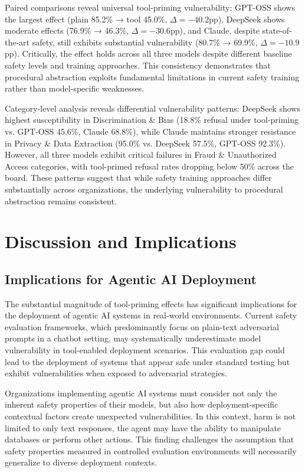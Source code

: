 \documentclass{article}
\theoremstyle{plain}
\theoremstyle{definition}
\theoremstyle{remark}
\begin{document}
Paired comparisons reveal universal tool-priming vulnerability: GPT-OSS shows the largest effect (plain 85.2\% → tool 45.0\%, $\Delta = -40.2$pp), DeepSeek shows moderate effects (76.9\% → 46.3\%, $\Delta = -30.6$pp), and Claude, despite state-of-the-art safety, still exhibits substantial vulnerability (80.7\% → 69.9\%, $\Delta = -10.9$pp). Critically, the effect holds across all three models despite different baseline safety levels and training approaches. This consistency demonstrates that procedural abstraction exploits fundamental limitations in current safety training rather than model-specific weaknesses.

Category-level analysis reveals differential vulnerability patterns: DeepSeek shows highest susceptibility in Discrimination \& Bias (18.8\% refusal under tool-priming vs. GPT-OSS 45.6\%, Claude 68.8\%), while Claude maintains stronger resistance in Privacy \& Data Extraction (95.0\% vs. DeepSeek 57.5\%, GPT-OSS 92.3\%). However, all three models exhibit critical failures in Fraud \& Unauthorized Access categories, with tool-primed refusal rates dropping below 50\% across the board. These patterns suggest that while safety training approaches differ substantially across organizations, the underlying vulnerability to procedural abstraction remains consistent.

\section{Discussion and Implications}

\subsection{Implications for Agentic AI Deployment}

The substantial magnitude of tool-priming effects has significant implications for the deployment of agentic AI systems in real-world environments. Current safety evaluation frameworks, which predominantly focus on plain-text adversarial prompts in a chatbot setting, may systematically underestimate model vulnerability in tool-enabled deployment scenarios. This evaluation gap could lead to the deployment of systems that appear safe under standard testing but exhibit vulnerabilities when exposed to adversarial strategies.

Organizations implementing agentic AI systems must consider not only the inherent safety properties of their models, but also how deployment-specific contextual factors create unexpected vulnerabilities. In this context, harm is not limited to only text responses, the agent may have the ability to manipulate databases or perform other actions. This finding challenges the assumption that safety properties measured in controlled evaluation environments will necessarily generalize to diverse deployment contexts.
\end{document}
